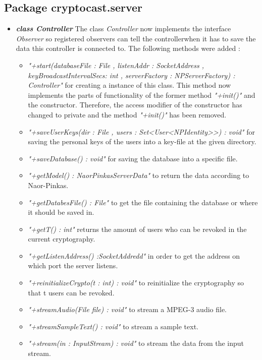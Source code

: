 \documentclass[a4paper,10pt]{scrartcl}
\begin{document}
\subsection{Package cryptocast.server}

\begin{itemize}
  
\item \textbf{\textit{class Controller}} \newline
The class \textit{Controller} now implements the interface \textit{Observer} so registered observers can 
tell the controllerwhen it has to save the data this controller is connected to.
The following methods were added :
	\begin{itemize}
	 \item \textit{"+start(databaseFile : File , listenAddr : SocketAddress , keyBroadcastIntervalSecs: int ,
		 serverFactory : NPServerFactory) : Controller"} for creating a instance of this class. This method now 
	 	implements the parts of functionality of the former method \textit{"+init()"}  and 
		the constructor. Therefore, the access modifier of the constructor has changed to private and the method  
		\textit{"+init()"} has been removed.
	 \item \textit{"+saveUserKeys(dir : File , users : Set<User<NPIdentity>>) : void"} for saving
		 the personal keys of the users into a key-file at the given directory.
	 \item \textit{"+saveDatabase() : void"} for saving the database into a specific file.
	 \item \textit{"+getModel() : NaorPinkasServerData"} to return the data according to Naor-Pinkas.
	 \item \textit{"+getDatabesFile() : File"} to get the file containing the database or where it should be saved in.
	\item \textit{"+getT() : int"} returns the amount of users who can be revoked in the current cryptography.
	\item \textit{"+getListenAddress() :SocketAddredd"} in order to get the address on which port the server listens.
	 \item \textit{"+reinitializeCrypto(t : int) : void"} to reinitialize the cryptography so that t users can be revoked.
	 \item \textit{"+streamAudio(File file) : void"} to stream a MPEG-3 audio file.
	 \item \textit{"+streamSampleText() : void"} to stream a sample text.
	 \item \textit{"+stream(in : InputStream) : void"} to stream the data from the input stream.

\end{itemize}
\end{itemize}
\end{document}
